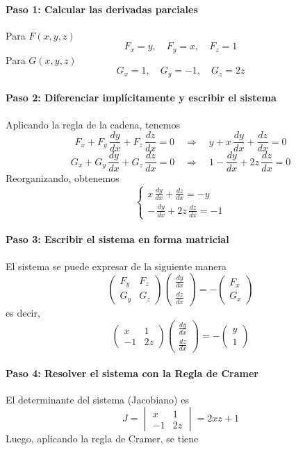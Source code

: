 \documentclass{article}
\begin{document}
\paragraph{\color{teal}Paso 1: Calcular las derivadas parciales}  
Para \( F(x,y,z) \)
\[
F_x = y,\quad F_y = x,\quad F_z = 1
\]
Para \( G(x,y,z) \)
\[
G_x = 1,\quad G_y = -1,\quad G_z = 2z
\]

\paragraph{\color{teal}Paso 2: Diferenciar implícitamente y escribir el sistema}  
Aplicando la regla de la cadena, tenemos
\[
F_x + F_y\,\frac{dy}{dx}+F_z\,\frac{dz}{dx}=0 \quad \Longrightarrow \quad y + x\,\frac{dy}{dx}+ \frac{dz}{dx} = 0
\]
\[
G_x + G_y\,\frac{dy}{dx}+G_z\,\frac{dz}{dx}=0 \quad \Longrightarrow \quad 1 - \frac{dy}{dx}+2z\,\frac{dz}{dx} = 0
\]
Reorganizando, obtenemos
\[
\begin{cases}
x\,\frac{dy}{dx}+ \frac{dz}{dx} = -y \\
-\,\frac{dy}{dx}+2z\,\frac{dz}{dx} = -1
\end{cases}
\]

\paragraph{\color{teal}Paso 3: Escribir el sistema en forma matricial}  
El sistema se puede expresar de la siguiente manera
\[
\begin{pmatrix}
F_y & F_z \\
G_y & G_z
\end{pmatrix}
\begin{pmatrix}
\frac{dy}{dx} \\
\frac{dz}{dx}
\end{pmatrix}
=
-\begin{pmatrix}
F_x \\
G_x
\end{pmatrix}
\]
es decir,
\[
\begin{pmatrix}
x & 1 \\
-1 & 2z
\end{pmatrix}
\begin{pmatrix}
\frac{dy}{dx} \\
\frac{dz}{dx}
\end{pmatrix}
=
-\begin{pmatrix}
y \\
1
\end{pmatrix}
\]

\paragraph{\color{teal}Paso 4: Resolver el sistema con la Regla de Cramer}  
El determinante del sistema (Jacobiano) es
\[
J = \begin{vmatrix}
x & 1 \\
-1 & 2z
\end{vmatrix} = 2xz + 1
\]
Luego, aplicando la regla de Cramer, se tiene
\end{document}
